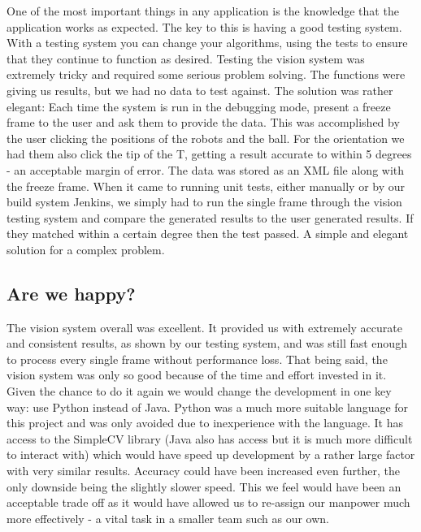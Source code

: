 One of the most important things in any application is the knowledge that the application works as expected. The key to this is having a good testing system. With a testing system you can change your algorithms, using the tests to ensure that they continue to function as desired. Testing the vision system was extremely tricky and required some serious problem solving. The functions were giving us results, but we had no data to test against. The solution was rather elegant: Each time the system is run in the debugging mode, present a freeze frame to the user and ask them to provide the data. This was accomplished by the user clicking the positions of the robots and the ball. For the orientation we had them also click the tip of the T, getting a result accurate to within 5 degrees - an acceptable margin of error. The data was stored as an XML file along with the freeze frame. When it came to running unit tests, either manually or by our build system Jenkins, we simply had to run the single frame through the vision testing system and compare the generated results to the user generated results. If they matched within a certain degree then the test passed. A simple and elegant solution for a complex problem. 

\subsection{Are we happy?}

The vision system overall was excellent. It provided us with extremely accurate and consistent results, as shown by our testing system, and was still fast enough to process every single frame without performance loss. That being said, the vision system was only so good because of the time and effort invested in it. Given the chance to do it again we would change the development in one key way: use Python instead of Java. Python was a much more suitable language for this project and was only avoided due to inexperience with the language. It has access to the SimpleCV library (Java also has access but it is much more difficult to interact with) which would have speed up development by a rather large factor with very similar results. Accuracy could have been increased even further, the only downside being the slightly slower speed. This we feel would have been an acceptable trade off as it would have allowed us to re-assign our manpower much more effectively - a vital task in a smaller team such as our own.





